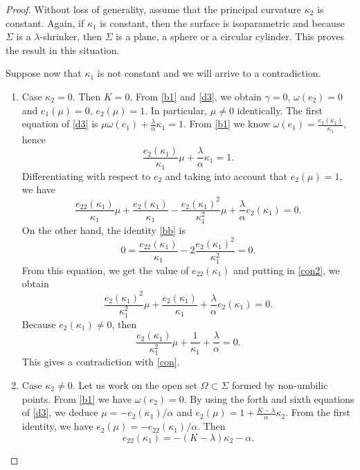 \documentclass[10pt,a4paper]{amsart}
\begin{document}
\begin{proof} Without loss of generality, assume that  the principal curvature $\kappa_2$ is constant. Again, if   $\kappa_1$ is constant, then the surface is isoparametric and because $\Sigma$ is a $\lambda$-shrinker, then  $\Sigma$ is a plane, a sphere or a circular cylinder. This proves the result  in this situation.

Suppose now that $\kappa_1$ is not constant and we will arrive to a contradiction.

\begin{enumerate}
\item Case $\kappa_2=0$. Then $K=0$. From \eqref{b1} and   \eqref{d3}, we obtain $\gamma=0$, $\omega(e_2)=0$ and $e_1(\mu)=0$, $e_2(\mu)=1$.      In particular,  $\mu\not=0$ identically. The first equation of \eqref{d3} is 
$\mu\omega(e_1) +\frac{\lambda}{\alpha}\kappa_1=1$. From \eqref{b1} we know $\omega(e_1)=\frac{e_2(\kappa_1)}{\kappa_1}$, hence
\begin{equation}\label{con}
\frac{e_2(\kappa_1)}{\kappa_1}\mu+\frac{\lambda}{\alpha}\kappa_1=1.
\end{equation}
Differentiating with respect to $e_2$ and taking into account that $e_2(\mu)=1$, we have  
\begin{equation}\label{con2}
\frac{e_{22}(\kappa_1)}{\kappa_1}\mu+\frac{e_2(\kappa_1)}{\kappa_1}-\frac{e_2(\kappa_1)^2}{\kappa_1^2}\mu+\frac{\lambda}{\alpha}e_2(\kappa_1)=0.
\end{equation}
On the other hand, the identity \eqref{bb} is 
$$0=\frac{e_{22}(\kappa_1)}{\kappa_1}-2\frac{e_2(\kappa_1)^2}{\kappa_1^2}=0.$$ 
From this equation, we get the value of $e_{22}(\kappa_1)$ and putting in \eqref{con2}, we obtain 
$$\frac{e_2(\kappa_1)^2}{\kappa_1^2}\mu+\frac{e_2(\kappa_1)}{\kappa_1}+\frac{\lambda}{\alpha}e_2(\kappa_1)=0.$$
Because $e_2(\kappa_1)\not=0$, then
$$\frac{e_2(\kappa_1)}{\kappa_1^2}\mu+\frac{1}{\kappa_1}+\frac{\lambda}{\alpha}=0.$$
This gives a contradiction with \eqref{con}.
\item Case $\kappa_2\not=0$.    Let us work on the  open set $\Omega\subset \Sigma$ formed by non-umbilic points. From \eqref{b1} we have $\omega(e_2)=0$. By using the forth and sixth equations of \eqref{d3}, we deduce   $\mu=- e_2(\kappa_1)/\alpha$ and $e_2(\mu)=1+\frac{K-\lambda}{\alpha}\kappa_2$. From the first identity, we have  
$e_2(\mu)=-  e_{22}(\kappa_1)/\alpha$. Then 
\begin{equation}\label{d22}
e_{22}(\kappa_1)=-(K-\lambda)\kappa_2-\alpha.
\end{equation}

\end{enumerate}
\end{proof}
\end{document}
